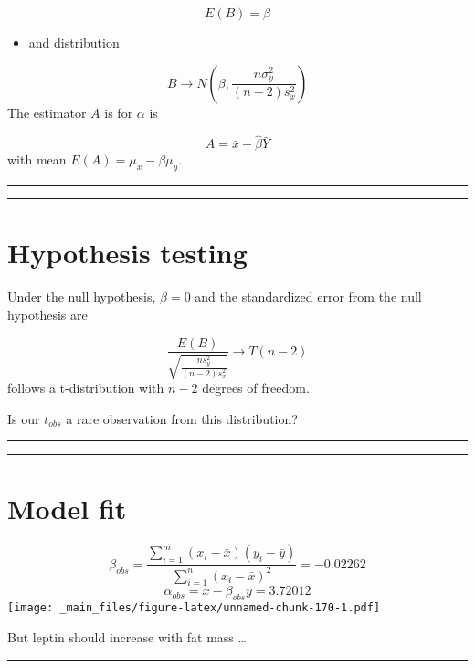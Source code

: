 \documentclass[
]{book}
\providecommand{\tightlist}{%
  \setlength{\itemsep}{0pt}\setlength{\parskip}{0pt}}
\begin{document}
\[E(B)=\beta\]

\begin{itemize}
\tightlist
\item
  and distribution
\end{itemize}

\[B \rightarrow N(\beta, \frac{n\sigma^2_y}{{(n-2)s^2_x}})\]
The estimator \(A\) is for \(\alpha\) is

\[A=\bar{x}-\hat{\beta} \bar{Y}\]
with mean \(E(A)=\mu_x-\beta\mu_y\).

\begin{center}\rule{0.5\linewidth}{0.5pt}\end{center}

\begin{center}\rule{0.5\linewidth}{0.5pt}\end{center}

\hypertarget{hypothesis-testing-6}{%
\section{Hypothesis testing}\label{hypothesis-testing-6}}

Under the null hypothesis, \(\beta=0\) and the standardized error from the null hypothesis are

\[\frac{E(B)}{\sqrt{\frac{ns^2_y}{{(n-2)s^2_x}}}} \rightarrow T(n-2)\]
follows a t-distribution with \(n-2\) degrees of freedom.

Is our \(t_{obs}\) a rare observation from this distribution?

\begin{center}\rule{0.5\linewidth}{0.5pt}\end{center}

\begin{center}\rule{0.5\linewidth}{0.5pt}\end{center}

\hypertarget{model-fit}{%
\section{Model fit}\label{model-fit}}

\[\beta_{obs}= \frac{\sum_{i=1}^m(x_i-\bar{x})(y_i-\bar{y})}{\sum_{i=1}^n(x_i-\bar{x})^2}= -0.02262\]
\[\alpha_{obs}=\bar{x}-\beta_{obs}\bar{y}= 3.72012\]
\texttt{[image: \_main\_files/figure-latex/unnamed-chunk-170-1.pdf]}

But leptin should increase with fat mass \ldots{}

\begin{center}\rule{0.5\linewidth}{0.5pt}\end{center}
\end{document}
